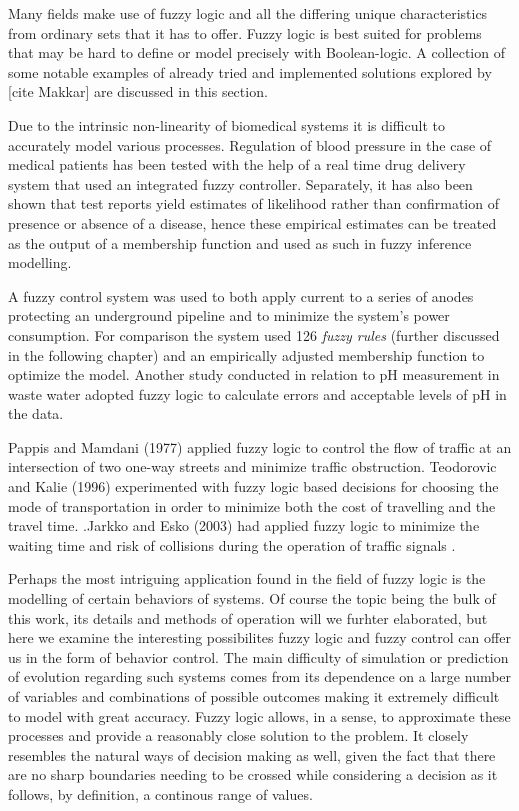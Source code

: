 Many fields make use of fuzzy logic and all the differing unique characteristics from ordinary sets that it has to offer. Fuzzy logic is best suited for problems that may be hard to define or model precisely with Boolean-logic. A collection of some notable examples of already tried and implemented solutions explored by [cite Makkar] are discussed in this section.

Due to the intrinsic non-linearity of biomedical systems it is difficult to accurately model various processes. Regulation of blood pressure in the case of medical patients has been tested with the help of a real time drug delivery system that used an integrated fuzzy controller. Separately, it has also been shown that test reports yield estimates of likelihood rather than confirmation of presence or absence of a disease, hence these empirical estimates can be treated as the output of a membership function and used as such in fuzzy inference modelling.

A fuzzy control system was used to both apply current to a series of anodes protecting an underground pipeline and to minimize the system's power consumption. For comparison the system used 126 \textit{fuzzy rules} (further discussed in the following chapter) and an empirically adjusted membership function to optimize the model. Another study conducted in relation to pH measurement in waste water adopted fuzzy logic to calculate errors and acceptable levels of pH in the data. 

Pappis and Mamdani (1977) applied fuzzy logic to control the flow of traffic at an intersection of two one-way streets and minimize traffic obstruction. Teodorovic and Kalie (1996) experimented with fuzzy logic based decisions for choosing the mode of transportation in order to minimize both the cost of travelling and the travel time. .Jarkko and Esko (2003) had applied fuzzy logic to minimize the waiting time and risk of collisions during the operation of traffic signals .

Perhaps the most intriguing application found in the field of fuzzy logic is the modelling of certain behaviors of systems. Of course the topic being the bulk of this work, its details and methods of operation will we furhter elaborated, but here we examine the interesting possibilites fuzzy logic and fuzzy control can offer us in the form of  behavior control. The main difficulty of simulation or prediction of evolution regarding such systems comes from its dependence on a large number of variables and combinations of possible outcomes making it extremely difficult to model with great accuracy. Fuzzy logic allows, in a sense, to approximate these processes and provide a reasonably close solution to the problem. It closely resembles the natural ways of decision making as well, given the fact that there are no sharp boundaries needing to be crossed while considering a decision as it follows, by definition, a continous range of values.

